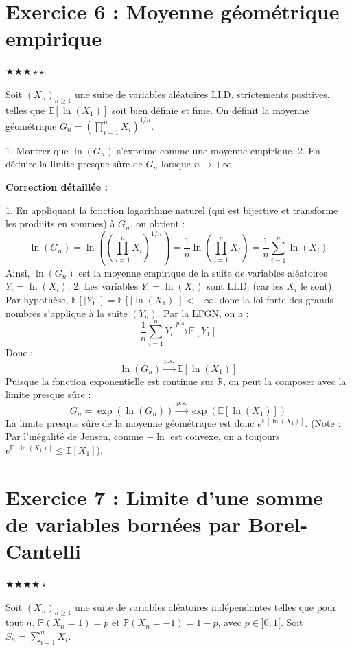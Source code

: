 \documentclass[11pt,a4paper]{article}
\begin{document}
\section*{Exercice 6 : Moyenne géométrique empirique}

$\bigstar\bigstar\bigstar\star\star$

Soit $(X_n)_{n \geq 1}$ une suite de variables aléatoires I.I.D. strictements positives, telles que $\mathbb{E}[\ln(X_1)]$ soit bien définie et finie.
On définit la moyenne géométrique $G_n = \left( \prod_{i=1}^n X_i \right)^{1/n}$.

1. Montrer que $\ln(G_n)$ s'exprime comme une moyenne empirique.
2. En déduire la limite presque sûre de $G_n$ lorsque $n \to +\infty$.

\textbf{Correction détaillée :}

1. En appliquant la fonction logarithme naturel (qui est bijective et transforme les produits en sommes) à $G_n$, on obtient :
   $$ \ln(G_n) = \ln\left( \left( \prod_{i=1}^n X_i \right)^{1/n} \right) = \frac{1}{n} \ln\left( \prod_{i=1}^n X_i \right) = \frac{1}{n} \sum_{i=1}^n \ln(X_i) $$
   Ainsi, $\ln(G_n)$ est la moyenne empirique de la suite de variables aléatoires $Y_i = \ln(X_i)$.
2. Les variables $Y_i = \ln(X_i)$ sont I.I.D. (car les $X_i$ le sont).
   Par hypothèse, $\mathbb{E}[|Y_1|] = \mathbb{E}[|\ln(X_1)|] < +\infty$, donc la loi forte des grands nombres s'applique à la suite $(Y_n)$.
   Par la LFGN, on a :
   $$ \frac{1}{n} \sum_{i=1}^n Y_i \xrightarrow{p.s.} \mathbb{E}[Y_1] $$
   Donc :
   $$ \ln(G_n) \xrightarrow{p.s.} \mathbb{E}[\ln(X_1)] $$
   Puisque la fonction exponentielle est continue sur $\mathbb{R}$, on peut la composer avec la limite presque sûre :
   $$ G_n = \exp(\ln(G_n)) \xrightarrow{p.s.} \exp(\mathbb{E}[\ln(X_1)]) $$
   La limite presque sûre de la moyenne géométrique est donc $e^{\mathbb{E}[\ln(X_1)]}$.
   (Note : Par l'inégalité de Jensen, comme $-\ln$ est convexe, on a toujours $e^{\mathbb{E}[\ln(X_1)]} \leq \mathbb{E}[X_1]$).


\section*{Exercice 7 : Limite d'une somme de variables bornées par Borel-Cantelli}

$\bigstar\bigstar\bigstar\bigstar\star$

Soit $(X_n)_{n \geq 1}$ une suite de variables aléatoires indépendantes telles que pour tout $n$, $\mathbb{P}(X_n = 1) = p$ et $\mathbb{P}(X_n = -1) = 1-p$, avec $p \in ]0, 1[$.
Soit $S_n = \sum_{i=1}^n X_i$.
\end{document}
